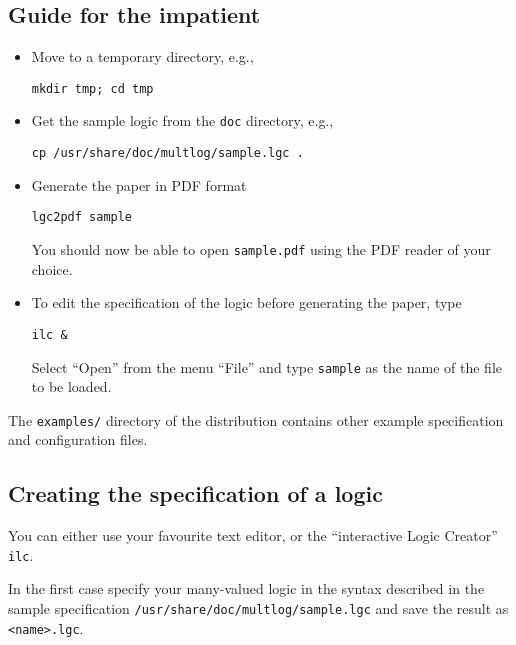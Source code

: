 \documentclass[]{article}
\newcommand{\passthrough}[1]{#1}
\begin{document}
\hypertarget{guide-for-the-impatient}{%
\subsection{Guide for the impatient}\label{guide-for-the-impatient}}

\begin{itemize}
\item
  Move to a temporary directory, e.g.,

\begin{lstlisting}
mkdir tmp; cd tmp
\end{lstlisting}
\item
  Get the sample logic from the \passthrough{\lstinline!doc!} directory,
  e.g.,

\begin{lstlisting}
cp /usr/share/doc/multlog/sample.lgc .
\end{lstlisting}
\item
  Generate the paper in PDF format

\begin{lstlisting}
lgc2pdf sample
\end{lstlisting}

  You should now be able to open \passthrough{\lstinline!sample.pdf!}
  using the PDF reader of your choice.
\item
  To edit the specification of the logic before generating the paper,
  type

\begin{lstlisting}
ilc &
\end{lstlisting}

  Select ``Open'' from the menu ``File'' and type
  \passthrough{\lstinline!sample!} as the name of the file to be loaded.
\end{itemize}

The \passthrough{\lstinline!examples/!} directory of the distribution
contains other example specification and configuration files.

\hypertarget{creating-the-specification-of-a-logic}{%
\subsection{Creating the specification of a
logic}\label{creating-the-specification-of-a-logic}}

You can either use your favourite text editor, or the ``interactive
Logic Creator'' \passthrough{\lstinline!ilc!}.

In the first case specify your many-valued logic in the syntax described
in the sample specification
\passthrough{\lstinline!/usr/share/doc/multlog/sample.lgc!} and save the
result as \passthrough{\lstinline!<name>.lgc!}.
\end{document}
